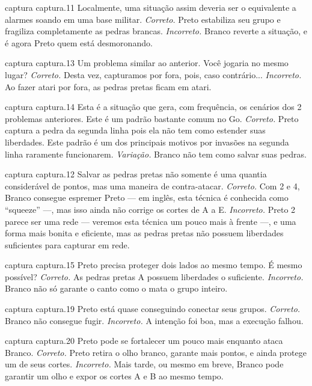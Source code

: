 \problemAnswerDiagram
  {captura}
  {captura.11}
  {Localmente, uma situação assim deveria ser o equivalente a alarmes soando em uma base militar.}
  {\emph{Correto.} Preto estabiliza seu grupo e fragiliza completamente as pedras brancas.}
  {\emph{Incorreto.} Branco reverte a situação, e é agora Preto quem está desmoronando.}

\problemAnswerDiagram
  {captura}
  {captura.13}
  {Um problema similar ao anterior. Você jogaria no mesmo lugar?}
  {\emph{Correto.} Desta vez, capturamos por fora, pois, caso contrário...}
  {\emph{Incorreto.} Ao fazer atari por fora, as pedras pretas ficam em atari.}

\problemAnswerDiagram
  {captura}
  {captura.14}
  {Esta é a situação que gera, com frequência, os cenários dos 2 problemas anteriores. Este é um padrão bastante comum no Go.}
  {\emph{Correto.} Preto captura a pedra da segunda linha pois ela não tem como estender suas liberdades. Este padrão é um dos principais motivos por invasões na segunda linha raramente funcionarem.}
  {\emph{Variação.} Branco não tem como salvar suas pedras.}

\problemAnswerDiagram
  {captura}
  {captura.12}
  {Salvar as pedras pretas não somente é uma quantia considerável de pontos, mas uma maneira de contra-atacar.}
  {\emph{Correto.} Com 2 e 4, Branco consegue espremer Preto --- em inglês, esta técnica é conhecida como ``squeeze'' ---, mas isso ainda não corrige os cortes de A a E.}
  {\emph{Incorreto.} Preto 2 parece ser uma rede --- veremos esta técnica um pouco mais à frente ---, e uma forma mais bonita e eficiente, mas as pedras pretas não possuem liberdades suficientes para capturar em rede.}

\problemAnswerDiagram
  {captura}
  {captura.15}
  {Preto precisa proteger dois lados ao mesmo tempo. É mesmo possível?}
  {\emph{Correto.} As pedras pretas A possuem liberdades o suficiente.}
  {\emph{Incorreto.} Branco não só garante o canto como o mata o grupo inteiro.}

\problemAnswerDiagram
  {captura}
  {captura.19}
  {Preto está quase conseguindo conectar seus grupos.}
  {\emph{Correto.} Branco não consegue fugir.}
  {\emph{Incorreto.} A intenção foi boa, mas a execução falhou.}

\problemAnswerDiagram
  {captura}
  {captura.20}
  {Preto pode se fortalecer um pouco mais enquanto ataca Branco.}
  {\emph{Correto.} Preto retira o olho branco, garante mais pontos, e ainda protege um de seus cortes.}
  {\emph{Incorreto.} Mais tarde, ou mesmo em breve, Branco pode garantir um olho e expor os cortes A e B ao mesmo tempo.}


